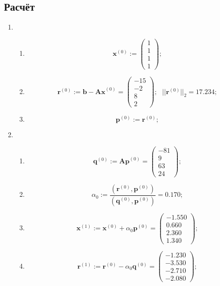 \subsection{Расчёт}
\begin{enumerate}
    \item \begin{enumerate}
        \item $$\mathbf{x}^{(0)} :=
        \begin{pmatrix} 1\\ 1\\ 1\\ 1 \end{pmatrix};$$

        \item $$\mathbf{r}^{(0)} :=
            \mathbf{b-Ax}^{(0)} = \begin{pmatrix} -15\\ -2\\ 8 \\ 2 \end{pmatrix}; ~~~
        ||\mathbf{r}^{(0)}||_2 = \mathbf{17.234};$$

        \item $$\mathbf{p}^{(0)} := \mathbf{r}^{(0)};$$
    \end{enumerate}

    \item \begin{enumerate}
        \item $$\mathbf{q}^{(0)} :=
            \mathbf{Ap}^{(0)} = \begin{pmatrix} -81\\ 9\\ 63\\ 24 \end{pmatrix};$$

        \item $$\alpha_0 :=
            \dfrac{(\mathbf{r}^{(0)}, \mathbf{p}^{(0)})}{(\mathbf{q}^{(0)}, \mathbf{p}^{(0)})} = 0.170;$$

        \item $$\mathbf{x}^{(1)} :=
            \mathbf{x}^{(0)}+\alpha_0\mathbf{p}^{(0)} = \begin{pmatrix} -1.550\\ 0.660\\ 2.360\\ 1.340 \end{pmatrix};$$

        \item $$\mathbf{r}^{(1)} :=
            \mathbf{r}^{(0)}-\alpha_0\mathbf{q}^{(0)} = \begin{pmatrix} -1.230\\ -3.530\\ -2.710 \\ -2.080 \end{pmatrix};$$


\end{enumerate}
\end{enumerate}
